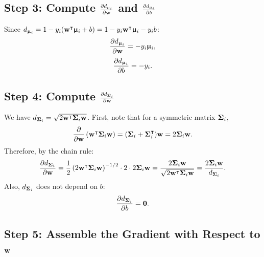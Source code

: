 \documentclass[11pt, letterpaper]{article}
\newcommand{\bSigma}{\vb{\Sigma}}
\newcommand{\bmu}{\boldsymbol{\upmu}}
\begin{document}
\subsection{Step 3: Compute $\pdv{d_{\mu_i}}{\vb{w}}$ and $\pdv{d_{\mu_i}}{b}$}

Since $d_{\bmu_i} = 1 - y_i(\vb{w}^{\intercal}\bmu_i + b) = 1 - y_i\vb{w}^{\intercal}\bmu_i - y_i b$:
\begin{equation}\label{eq:ddmu_dw}
    \pdv{d_{\bmu_i}}{\vb{w}} = -y_i \bmu_i,
\end{equation}
\begin{equation}\label{eq:ddmu_db}
    \pdv{d_{\bmu_i}}{b} = -y_i.
\end{equation}

\subsection{Step 4: Compute $\pdv{d_{\bSigma_i}}{\vb{w}}$}

We have $d_{\bSigma_i} = \sqrt{2\vb{w}^{\intercal}\bSigma_i\vb{w}}$. First, note that for a symmetric matrix $\bSigma_i$,
\begin{equation}
    \pdv{\vb{w}}\left(\vb{w}^{\intercal}\bSigma_i\vb{w}\right) = (\bSigma_i + \bSigma_i^{\intercal})\vb{w} = 2\bSigma_i\vb{w}.
\end{equation}
Therefore, by the chain rule:
\begin{equation}\label{eq:ddSigma_dw}
    \pdv{d_{\bSigma_i}}{\vb{w}} = \frac{1}{2}\left(2\vb{w}^{\intercal}\bSigma_i\vb{w}\right)^{-1/2}\cdot 2\cdot 2\bSigma_i\vb{w} = \frac{2\bSigma_i\vb{w}}{\sqrt{2\vb{w}^{\intercal}\bSigma_i\vb{w}}} = \frac{2\bSigma_i\vb{w}}{d_{\bSigma_i}}.
\end{equation}
Also, $d_{\bSigma_i}$ does not depend on $b$:
\begin{equation}\label{eq:ddSigma_db}
    \pdv{d_{\bSigma_i}}{b} = \vb{0}.
\end{equation}

\subsection{Step 5: Assemble the Gradient with Respect to $\vb{w}$}
\end{document}
